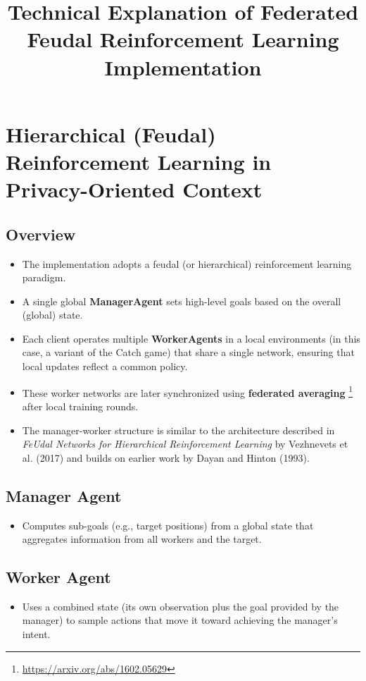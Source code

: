 \documentclass{article}
\title{Technical Explanation of Federated Feudal Reinforcement Learning Implementation}
\author{}
\date{}
\begin{document}
\maketitle

\section{Hierarchical (Feudal) Reinforcement Learning in Privacy-Oriented Context}

\subsection{Overview}
\begin{itemize}
    \item The implementation adopts a feudal (or hierarchical) reinforcement learning paradigm.
    \item A single global \textbf{ManagerAgent} sets high-level goals based on the overall (global) state.
    \item Each client operates multiple \textbf{WorkerAgents} in a local environments (in this case, a variant of the Catch game) that share a single network, ensuring that local updates reflect a common policy.
    \item These worker networks are later synchronized using \textbf{federated averaging} \cite{McMahan2016}\footnote{\url{https://arxiv.org/abs/1602.05629}} after local training rounds.
    \item The manager-worker structure is similar to the architecture described in \textit{FeUdal Networks for Hierarchical Reinforcement Learning} by Vezhnevets et al. (2017) and builds on earlier work by Dayan and Hinton (1993).
\end{itemize}

\subsection{Manager Agent}
\begin{itemize}
    \item Computes sub-goals (e.g., target positions) from a global state that aggregates information from all workers and the target.
\end{itemize}

\subsection{Worker Agent}
\begin{itemize}
    \item Uses a combined state (its own observation plus the goal provided by the manager) to sample actions that move it toward achieving the manager's intent.
\end{itemize}
\end{document}
